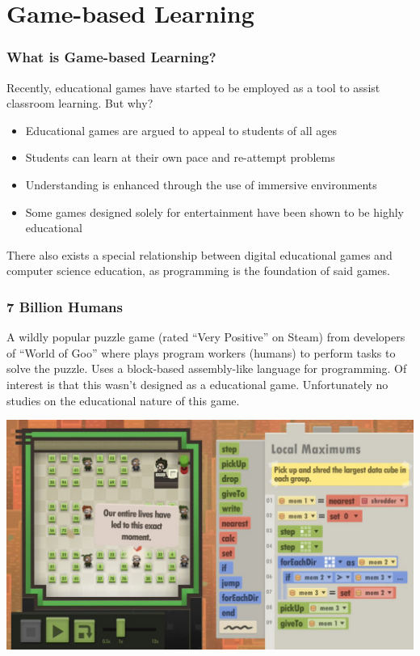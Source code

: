 \documentclass{beamer}
\begin{document}
\section{Game-based Learning}
\begin{frame}
  \frametitle{What is Game-based Learning?}
  Recently, educational games have started to be employed as a tool to assist classroom learning. But why?
  \pause
  \begin{itemize}
    \item Educational games are argued to appeal to students of all ages
    \item Students can learn at their own pace and re-attempt problems
    \item Understanding is enhanced through the use of immersive environments
    \item Some games designed solely for entertainment have been shown to be highly educational
  \end{itemize}
  \pause
  There also exists a special relationship between digital educational games and computer science education, as programming is the foundation of said games.
\end{frame}
\begin{frame}
  \frametitle{7 Billion Humans}
  A wildly popular puzzle game (rated ``Very Positive'' on Steam) from developers of ``World of Goo'' where plays program workers (humans) to perform tasks to solve the puzzle. Uses a block-based assembly-like language for programming. Of interest is that this wasn't designed as a educational game. Unfortunately no studies on the educational nature of this game.
\end{frame}
\begin{frame}
  \begin{center}
    \includegraphics[width=\textwidth,height=\textheight,keepaspectratio]{7bnhumans.jpg}
  \end{center}
\end{frame}
\end{document}
